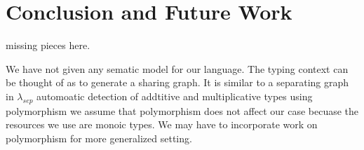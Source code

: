 \chapter{Conclusion and Future Work}\label{chp:conclusion}

missing pieces here.

We have not given any sematic model for our language. The typing context can be thought
of as to generate a sharing graph. It is similar to a separating graph in $\lambda_{sep}$ \citep{atkey_lambda_sep_2004}
automoatic detection of  addtitive and multiplicative types using polymorphism
we assume that polymorphism does not affect our case becuase the resources we use
are monoic types. We may have to incorporate work on polymorphism \cite{collinson_bunched_2005} for
more generalized setting.